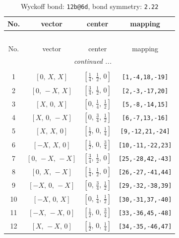 \documentclass[fleqn,8pt]{jsarticle}
\begin{document}
\begin{longtable}{cccc}
\caption{Wyckoff bond: {\tt 12b@6d}, bond symmetry: {\tt 2.22}}
 \\
 \hline \hline
No. & vector & center & mapping \\ \hline \endfirsthead

\multicolumn{3}{l}{\tablename\ \thetable{}} \\
 \hline \hline
No. & vector & center & mapping \\ \hline \endhead

 \hline \hline
\multicolumn{3}{r}{\footnotesize\it continued ...} \\ \endfoot

 \hline \hline
\multicolumn{3}{r}{} \\ \endlastfoot

1 & $\left[ 0,\, X,\, X \right]$ & $\left[ \frac{1}{4},\, \frac{1}{2},\, 0 \right]$ & {\tt [1,-4,18,-19]} \\ \hline
2 & $\left[ 0,\, - X,\, X \right]$ & $\left[ \frac{3}{4},\, \frac{1}{2},\, 0 \right]$ & {\tt [2,-3,-17,20]} \\ \hline
3 & $\left[ X,\, 0,\, X \right]$ & $\left[ 0,\, \frac{1}{4},\, \frac{1}{2} \right]$ & {\tt [5,-8,-14,15]} \\ \hline
4 & $\left[ X,\, 0,\, - X \right]$ & $\left[ 0,\, \frac{3}{4},\, \frac{1}{2} \right]$ & {\tt [6,-7,13,-16]} \\ \hline
5 & $\left[ X,\, X,\, 0 \right]$ & $\left[ \frac{1}{2},\, 0,\, \frac{1}{4} \right]$ & {\tt [9,-12,21,-24]} \\ \hline
6 & $\left[ - X,\, X,\, 0 \right]$ & $\left[ \frac{1}{2},\, 0,\, \frac{3}{4} \right]$ & {\tt [10,-11,-22,23]} \\ \hline
7 & $\left[ 0,\, - X,\, - X \right]$ & $\left[ \frac{3}{4},\, \frac{1}{2},\, 0 \right]$ & {\tt [25,-28,42,-43]} \\ \hline
8 & $\left[ 0,\, X,\, - X \right]$ & $\left[ \frac{1}{4},\, \frac{1}{2},\, 0 \right]$ & {\tt [26,-27,-41,44]} \\ \hline
9 & $\left[ - X,\, 0,\, - X \right]$ & $\left[ 0,\, \frac{3}{4},\, \frac{1}{2} \right]$ & {\tt [29,-32,-38,39]} \\ \hline
10 & $\left[ - X,\, 0,\, X \right]$ & $\left[ 0,\, \frac{1}{4},\, \frac{1}{2} \right]$ & {\tt [30,-31,37,-40]} \\ \hline
11 & $\left[ - X,\, - X,\, 0 \right]$ & $\left[ \frac{1}{2},\, 0,\, \frac{3}{4} \right]$ & {\tt [33,-36,45,-48]} \\ \hline
12 & $\left[ X,\, - X,\, 0 \right]$ & $\left[ \frac{1}{2},\, 0,\, \frac{1}{4} \right]$ & {\tt [34,-35,-46,47]} \\
\end{longtable}
\end{document}
